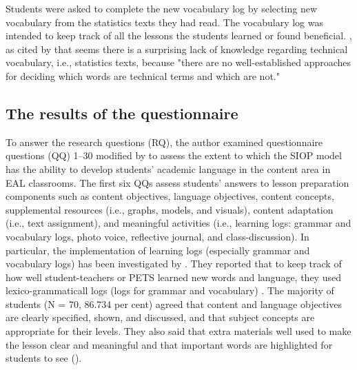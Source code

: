 \documentclass[english]{textolivre}
\begin{document}
Students were asked to complete the new vocabulary log by selecting new vocabulary from the statistics texts they had read. The vocabulary log was intended to keep track of all the lessons the students learned or found beneficial. \textcite[p. 251]{chung_identifying_2004}, as cited by \textcite{kwary_hybrid_2011} that seems there is a surprising lack of knowledge regarding technical vocabulary, i.e., statistics texts, because "there are no well-established approaches for deciding which words are technical terms and which are not."

\subsection{The results of the questionnaire}\label{sec-organizacao-latex}
To answer the research questions (RQ), the author examined questionnaire questions (QQ) 1–30 modified by \textcite{echevarria_making_2008} to assess the extent to which the SIOP model has the ability to develop students' academic language in the content area in EAL classrooms. The first six QQs assess students' answers to lesson preparation components such as content objectives, language objectives, content concepts, supplemental resources (i.e., graphs, models, and visuals), content adaptation (i.e., text assignment), and meaningful activities (i.e., learning logs: grammar and vocabulary logs, photo voice, reflective journal, and class-discussion). In particular, the implementation of learning logs (especially grammar and vocabulary logs) has been investigated by \textcite{yanto_implementing_2020}. They reported that to keep track of how well student-teachers or PETS learned new words and language, they used lexico-grammaticall logs (logs for grammar and vocabulary) \cite{yanto_implementing_2020}. The majority of students (N = 70, 86.734 per cent) agreed that content and language objectives are clearly specified, shown, and discussed, and that subject concepts are appropriate for their levels. They also said that extra materials well used to make the lesson clear and meaningful and that important words are highlighted for students to see ().
\end{document}
